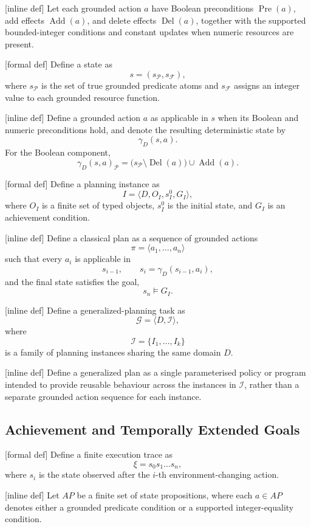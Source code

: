[inline def] Let each grounded action \(a\) have Boolean preconditions
\(\operatorname{Pre}(a)\), add effects \(\operatorname{Add}(a)\), and delete
effects \(\operatorname{Del}(a)\), together with the supported bounded-integer
conditions and constant updates when numeric resources are present.

[formal def] Define a state as
\[
s=(s_{\mathcal P},s_{\mathcal F}),
\]
where \(s_{\mathcal P}\) is the set of true grounded predicate atoms and
\(s_{\mathcal F}\) assigns an integer value to each grounded resource function.

[inline def] Define a grounded action \(a\) as applicable in \(s\) when its
Boolean and numeric preconditions hold, and denote the resulting deterministic
state by
\[
\gamma_D(s,a).
\]
For the Boolean component,
\[
\gamma_D(s,a)_{\mathcal P}
=
\bigl(s_{\mathcal P}\setminus\operatorname{Del}(a)\bigr)
\cup \operatorname{Add}(a).
\]

[formal def] Define a planning instance as
\[
I=\langle D,O_I,s_I^0,G_I\rangle,
\]
where \(O_I\) is a finite set of typed objects,
\(s_I^0\) is the initial state, and
\(G_I\) is an achievement condition.

[inline def] Define a classical plan as a sequence of grounded actions
\[
\pi=\langle a_1,\ldots,a_n\rangle
\]
such that every \(a_i\) is applicable in
\[
s_{i-1},
\qquad
s_i=\gamma_D(s_{i-1},a_i),
\]
and the final state satisfies the goal,
\[
s_n\models G_I.
\]

[inline def] Define a generalized-planning task as
\[
\mathcal G=\langle D,\mathcal I\rangle,
\]
where
\[
\mathcal I=\{I_1,\ldots,I_k\}
\]
is a family of planning instances sharing the same domain \(D\).

[inline def] Define a generalized plan as a single parameterised policy or
program intended to provide reusable behaviour across the instances in
\(\mathcal I\), rather than a separate grounded action sequence for each
instance.


\subsection{Achievement and Temporally Extended Goals}

[formal def] Define a finite execution trace as
\[
\xi=s_0s_1\ldots s_n,
\]
where \(s_i\) is the state observed after the \(i\)-th environment-changing
action.

[inline def] Let \(AP\) be a finite set of state propositions, where each
\(a\in AP\) denotes either a grounded predicate condition or a supported
integer-equality condition.

